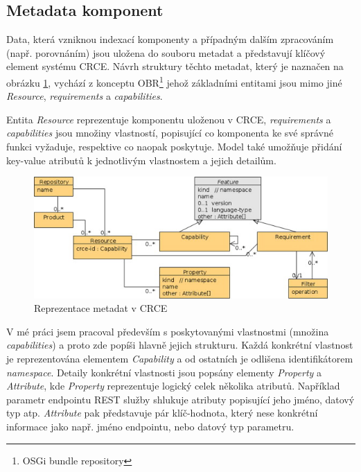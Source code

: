 \documentclass[czech,DP]{thesiskiv}
\begin{document}
\subsection{Metadata komponent}
\label{subsec:crce-metadata}

Data, která vzniknou indexací komponenty a případným dalším zpracováním (např. porovnáním) jsou uložena do souboru metadat a představují klíčový element systému CRCE. Návrh struktury  těchto metadat, který je naznačen na obrázku \ref{fig:crce-resource-uml}, vychází z konceptu OBR\footnote{OSGi bundle repository} jehož základními entitami jsou mimo jiné \textit{Resource}, \textit{requirements} a \textit{capabilities}\cite{brada2015repository}. 

Entita \textit{Resource} reprezentuje komponentu uloženou v CRCE, \textit{requirements} a \textit{capabilities} jsou množiny vlastností, popisující co komponenta ke své správné funkci vyžaduje, respektive co naopak poskytuje. Model také umožňuje přidání key-value atributů k jednotlivým vlastnostem a jejich detailům.
 
 \begin{figure}[h]
 	\centering
 	\includegraphics{resource-uml}
 	\caption{Reprezentace metadat v CRCE}
 	\label{fig:crce-resource-uml}
 \end{figure}

V mé práci jsem pracoval především s poskytovanými vlastnostmi (množina \textit{capabilities}) a proto zde popíši hlavně jejich strukturu. Každá konkrétní vlastnost je reprezentována elementem \textit{Capability} a od ostatních je odlišena identifikátorem \textit{namespace}. Detaily konkrétní vlastnosti jsou popsány elementy \textit{Property} a \textit{Attribute}, kde \textit{Property} reprezentuje logický celek několika atributů. Například parametr endpointu REST služby shlukuje atributy popisující jeho jméno, datový typ atp. \textit{Attribute} pak představuje pár klíč-hodnota, který nese konkrétní informace jako např. jméno endpointu, nebo datový typ parametru.
\end{document}
